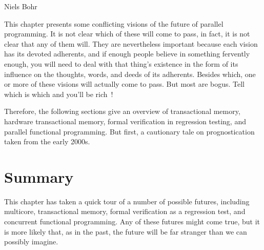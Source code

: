 
%
	 {Niels Bohr}

This chapter presents some conflicting visions of the future of parallel
programming.
It is not clear which of these will come to pass, in fact, it is not
clear that any of them will.
They are nevertheless important because each vision has its devoted
adherents, and if enough people believe in something fervently enough,
you will need to deal with that thing's existence in the form of its
influence on the thoughts, words, and deeds of its adherents.
Besides which, one or more of these visions will actually come to pass.
But most are bogus.
Tell which is which and you'll be rich~\cite{KeithRSpitz1977}!

Therefore, the following sections give an overview of transactional
memory, hardware transactional memory,
formal verification in regression testing, and
parallel functional programming.
But first, a cautionary tale on prognostication taken from the early 2000s.


\IfTwoColumn{}{\FloatBarrier}

\IfTwoColumn{}{\FloatBarrier}




\section{Summary}
\label{sec:future:Summary}

This chapter has taken a quick tour of a number of possible futures,
including multicore, transactional memory, formal verification as
a regression test, and concurrent functional programming.
Any of these futures might come true, but it is more likely that, as in
the past, the future will be far stranger than we can possibly imagine.

